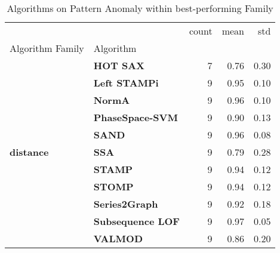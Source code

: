 \begin{table}[h]
\centering
\caption{Algorithms on Pattern Anomaly within best-performing Family}
\label{tab:bp-pattern}
\begin{tabular}{llrrr}
\toprule
 &  & count & mean & std \\
Algorithm Family & Algorithm &  &  &  \\
\midrule
\multirow[t]{11}{*}{\textbf{distance}} & \textbf{HOT SAX} & 7 & 0.76 & 0.30 \\
\textbf{} & \textbf{Left STAMPi} & 9 & 0.95 & 0.10 \\
\textbf{} & \textbf{NormA} & 9 & 0.96 & 0.10 \\
\textbf{} & \textbf{PhaseSpace-SVM} & 9 & 0.90 & 0.13 \\
\textbf{} & \textbf{SAND} & 9 & 0.96 & 0.08 \\
\textbf{} & \textbf{SSA} & 9 & 0.79 & 0.28 \\
\textbf{} & \textbf{STAMP} & 9 & 0.94 & 0.12 \\
\textbf{} & \textbf{STOMP} & 9 & 0.94 & 0.12 \\
\textbf{} & \textbf{Series2Graph} & 9 & 0.92 & 0.18 \\
\textbf{} & \textbf{Subsequence LOF} & 9 & 0.97 & 0.05 \\
\textbf{} & \textbf{VALMOD} & 9 & 0.86 & 0.20 \\
\cline{1-5}
\bottomrule
\end{tabular}
\end{table}
